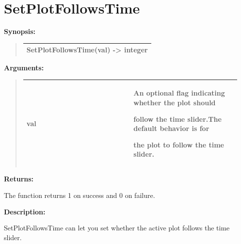 \documentclass[letterpaper,10pt,english]{sphinxmanual}
\begin{document}
\section{SetPlotFollowsTime}
\label{functions:setplotfollowstime}
\begin{DUlineblock}{0em}
\item[] \textbf{Synopsis:}
\end{DUlineblock}
\begin{quote}

\begin{tabulary}{\linewidth}{|L|}
\hline

SetPlotFollowsTime(val) -\textgreater{} integer
\\
\hline\end{tabulary}

\end{quote}

\begin{DUlineblock}{0em}
\item[] 
\item[] \textbf{Arguments:}
\end{DUlineblock}
\begin{quote}

\begin{tabular}{|p{0.475\linewidth}|p{0.475\linewidth}|}
\hline

val
 & 
\begin{DUlineblock}{0em}
\item[] An optional flag indicating whether the plot should
\item[] follow the time slider.The default behavior is for
\item[] the plot to follow the time slider.
\end{DUlineblock}
\\
\hline\end{tabular}

\end{quote}

\begin{DUlineblock}{0em}
\item[] 
\item[] \textbf{Returns:}
\item[] The function returns 1 on success and 0 on failure.
\item[] 
\item[] \textbf{Description:}
\item[] SetPlotFollowsTime can let you set whether the active plot follows the time slider.
\end{DUlineblock}
\end{document}
